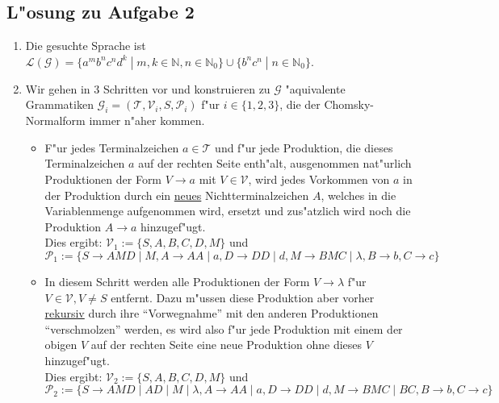 \documentclass[10pt,oneside,onecolumn,a4paper,german,titlepage]{article}
\begin{document}
\subsection*{L"osung zu Aufgabe 2}
\begin{enumerate}
\item Die gesuchte Sprache ist $\mathcal{L}(\mathcal{G}) = \{a^mb^nc^nd^k \; | \;
m,k \in \mathbb{N}, n \in \mathbb{N}_0\} \cup \{b^nc^n \; | \; n \in \mathbb{N}_0\}$.
\item Wir gehen in 3 Schritten vor und konstruieren zu $\mathcal{G}$ "aquivalente
Grammatiken $\mathcal{G}_i = (\mathcal{T},\mathcal{V}_i,S,\mathcal{P}_i)$ f"ur
$i \in \{1,2,3\}$, die der Chomsky-Normalform immer n"aher kommen.
\begin{itemize}
\item F"ur jedes Terminalzeichen $a \in \mathcal{T}$ und f"ur jede Produktion, die
dieses Terminalzeichen $a$ auf der rechten Seite enth"alt, ausgenommen nat"urlich
Produktionen der Form $V \rightarrow a$ mit $V \in \mathcal{V}$, wird jedes Vorkommen
von $a$ in der Produktion durch ein \underline{neues} Nichtterminalzeichen $A$,
welches in die Variablenmenge aufgenommen wird, ersetzt und zus"atzlich wird noch
die Produktion $A \rightarrow a$ hinzugef"ugt.\\
Dies ergibt: $\mathcal{V}_1 := \{S,A,B,C,D,M\}$ und\\
$\mathcal{P}_1 := \{
S \rightarrow AMD \; | \; M, A \rightarrow AA \; | \; a, D \rightarrow DD \; | \; d,
M \rightarrow BMC \; | \; \lambda, B \rightarrow b, C \rightarrow c\}$
\item In diesem Schritt werden alle Produktionen der Form $V \rightarrow \lambda$
f"ur $V \in \mathcal{V}, V \not= S$ entfernt. Dazu m"ussen diese Produktion aber
vorher \underline{rekursiv} durch ihre ``Vorwegnahme'' mit den anderen Produktionen
``verschmolzen'' werden, es wird also f"ur jede Produktion mit einem der obigen $V$
auf der rechten Seite eine neue Produktion ohne dieses $V$ hinzugef"ugt.\\
Dies ergibt: $\mathcal{V}_2 := \{S,A,B,C,D,M\}$ und\\
$\mathcal{P}_2 := \{
S \rightarrow AMD \; | \; AD \; | \; M \; | \; \lambda, A \rightarrow AA \; | \; a,
D \rightarrow DD \; | \; d, M \rightarrow BMC \; | \; BC, B \rightarrow b,
C \rightarrow c\}$

\newpage


\end{itemize}
\end{enumerate}
\end{document}
